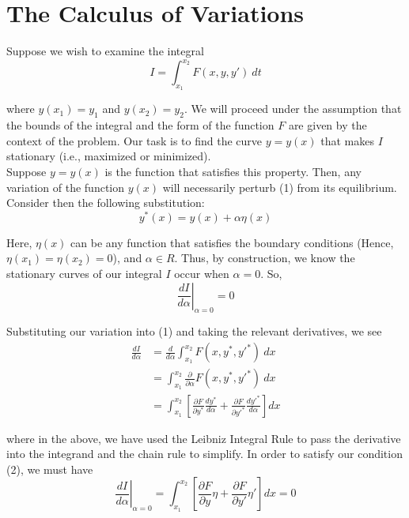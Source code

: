 \documentclass[12pt]{article}
\begin{document}
\section{The Calculus of Variations}

Suppose we wish to examine the integral 
\begin{equation}
I = \int_{x_1}^{x_2} F(x, y, y')\:dt
\end{equation}

where $y(x_1) = y_1$ and $y(x_2) = y_2$. We will proceed under the assumption that the bounds of the integral and the form of the function $F$ are given by the context of the problem. Our task is to find the curve $y=y(x)$ that makes $I$ stationary (i.e., maximized or minimized). \\

Suppose $y = y(x)$ is the function that satisfies this property. Then, any variation of the function $y(x)$ will necessarily perturb (1) from its equilibrium. Consider then the following substitution: 
\begin{equation*}
y^*(x) = y(x) + \alpha \eta(x)
\end{equation*}

Here, $\eta(x)$ can be any function that satisfies the boundary conditions (Hence, $\eta(x_1) = \eta(x_2) = 0$), and $\alpha \in R$. Thus, by construction, we know the stationary curves of our integral $I$ occur when $\alpha = 0$. So,
\begin{equation}
\left. \frac{dI}{d\alpha} \right|_{\alpha = 0} = 0
\end{equation}

Substituting our variation into (1) and taking the relevant derivatives, we see
\begin{align*}
\frac{dI}{d \alpha}
	&= \frac{d}{d \alpha} \int_{x_1}^{x_2} 
		F(x, y^*, y'^*)\:dx 										\\
	&= \int_{x_1}^{x_2} 
		\frac{\partial}{\partial \alpha} F(x, y^*, y'^*) \: dx		\\
	&= \int_{x_1}^{x_2} 
		\left[ \frac{\partial F}{\partial y^*} \frac{dy^*}{d \alpha} 
		+ \frac{\partial F}{\partial y'^*} \frac{dy'^*}{d\alpha} \right] dx
\end{align*}

where in the above, we have used the Leibniz Integral Rule to pass the derivative into the integrand and the chain rule to simplify. In order to satisfy our condition (2), we must have
\begin{equation*}
\left. \frac{dI}{d\alpha} \right|_{\alpha = 0} =
\int_{x_1}^{x_2} \left[ \frac{\partial F}{\partial y} \eta
		+  \frac{\partial F}{\partial y'} \eta' \right] dx = 0
\end{equation*}
\end{document}

